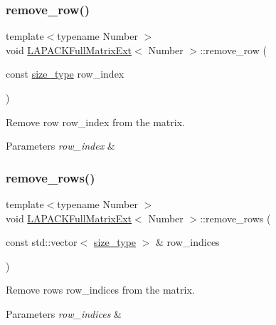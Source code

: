 \subsubsection{\texorpdfstring{remove\+\_\+row()}{remove\_row()}}
{\footnotesize\ttfamily template$<$typename Number $>$ \\
void \hyperlink{classLAPACKFullMatrixExt}{L\+A\+P\+A\+C\+K\+Full\+Matrix\+Ext}$<$ Number $>$\+::remove\+\_\+row (\begin{DoxyParamCaption}\item[{const \hyperlink{classLAPACKFullMatrixExt_a5cf5f4a6104dc17029210b5ca52bf574}{size\+\_\+type}}]{row\+\_\+index }\end{DoxyParamCaption})}

Remove row {\ttfamily row\+\_\+index} from the matrix. 
\begin{DoxyParams}{Parameters}
{\em row\+\_\+index} & \\
\hline
\end{DoxyParams}
\mbox{\label{classLAPACKFullMatrixExt_a98d770a58dd87d57a3763f55e0b45502}} 
\subsubsection{\texorpdfstring{remove\+\_\+rows()}{remove\_rows()}}
{\footnotesize\ttfamily template$<$typename Number $>$ \\
void \hyperlink{classLAPACKFullMatrixExt}{L\+A\+P\+A\+C\+K\+Full\+Matrix\+Ext}$<$ Number $>$\+::remove\+\_\+rows (\begin{DoxyParamCaption}\item[{const std\+::vector$<$ \hyperlink{classLAPACKFullMatrixExt_a5cf5f4a6104dc17029210b5ca52bf574}{size\+\_\+type} $>$ \&}]{row\+\_\+indices }\end{DoxyParamCaption})}

Remove rows {\ttfamily row\+\_\+indices} from the matrix. 
\begin{DoxyParams}{Parameters}
{\em row\+\_\+indices} & \\
\hline
\end{DoxyParams}
\mbox{\label{classLAPACKFullMatrixExt_abae222273b3fd527dff492aed33c1b6e}} 
